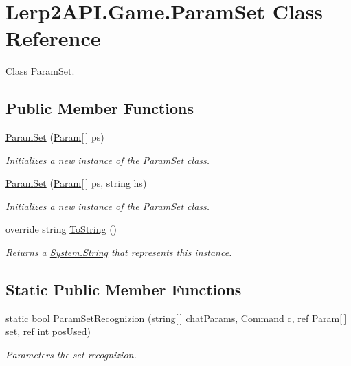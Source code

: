 \hypertarget{class_lerp2_a_p_i_1_1_game_1_1_param_set}{}\section{Lerp2\+A\+P\+I.\+Game.\+Param\+Set Class Reference}
\label{class_lerp2_a_p_i_1_1_game_1_1_param_set}


Class \hyperlink{class_lerp2_a_p_i_1_1_game_1_1_param_set}{Param\+Set}.  


\subsection*{Public Member Functions}
\begin{DoxyCompactItemize}
\item 
\hyperlink{class_lerp2_a_p_i_1_1_game_1_1_param_set_afca36df5dfdfc4de70db033a8714eca5}{Param\+Set} (\hyperlink{class_lerp2_a_p_i_1_1_game_1_1_param}{Param}\mbox{[}$\,$\mbox{]} ps)
\begin{DoxyCompactList}\small\item\em Initializes a new instance of the \hyperlink{class_lerp2_a_p_i_1_1_game_1_1_param_set}{Param\+Set} class. \end{DoxyCompactList}\item 
\hyperlink{class_lerp2_a_p_i_1_1_game_1_1_param_set_aee43b9e55e5c5382eabe60fa445e23ba}{Param\+Set} (\hyperlink{class_lerp2_a_p_i_1_1_game_1_1_param}{Param}\mbox{[}$\,$\mbox{]} ps, string hs)
\begin{DoxyCompactList}\small\item\em Initializes a new instance of the \hyperlink{class_lerp2_a_p_i_1_1_game_1_1_param_set}{Param\+Set} class. \end{DoxyCompactList}\item 
override string \hyperlink{class_lerp2_a_p_i_1_1_game_1_1_param_set_a519d30e3224797a78585c30412b6d3b0}{To\+String} ()
\begin{DoxyCompactList}\small\item\em Returns a \hyperlink{namespace_lerp2_a_p_i_1_1_game_a2f182da062f210cc43f341f6992ee293a27118326006d3829667a400ad23d5d98}{System.\+String} that represents this instance. \end{DoxyCompactList}\end{DoxyCompactItemize}
\subsection*{Static Public Member Functions}
\begin{DoxyCompactItemize}
\item 
static bool \hyperlink{class_lerp2_a_p_i_1_1_game_1_1_param_set_a0d3effe2f519c6f7e15a9e3ffe102518}{Param\+Set\+Recognizion} (string\mbox{[}$\,$\mbox{]} chat\+Params, \hyperlink{class_lerp2_a_p_i_1_1_game_1_1_command}{Command} c, ref \hyperlink{class_lerp2_a_p_i_1_1_game_1_1_param}{Param}\mbox{[}$\,$\mbox{]} set, ref int pos\+Used)
\begin{DoxyCompactList}\small\item\em Parameters the set recognizion. \end{DoxyCompactList}\end{DoxyCompactItemize}
